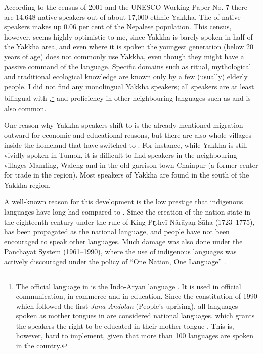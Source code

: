 According to the  census of 2001 \citep{CBS2001Report} and the UNESCO Working Paper No. 7 \citep{Toba2005Unesco}  there are 14,648 native speakers out of about 17,000 ethnic Yakkha. The  of native speakers makes up 0.06 per cent of the Nepalese population. This census, however, seems highly optimistic to me, since Yakkha is barely spoken in half of the Yakkha area, and even where it is spoken the youngest generation (below 20 years of age) does not commonly use Yakkha, even though they might have a passive command of the language. Specific domains such as ritual, mythological and traditional ecological knowledge are known only by a few (usually) elderly people. I did not find any monolingual Yakkha speakers; all speakers are at least bilingual with ,\footnote{The official language in  is the Indo-Aryan language . It is used in official communication,  in commerce and in  education. Since the constitution of 1990 which followed the first \emph{Jana Andolan} (People's uprising), all languages spoken as mother tongues in  are considered national languages, which grants the speakers the right to be educated in their mother tongue \citep{Turin2007_Diversity}. This is, however, hard to implement, given that more than 100 languages are spoken in the country.} and proficiency in other neighbouring languages such as  and  is also common.

One reason why Yakkha  speakers shift to  is the already mentioned migration outward for economic and educational reasons, but there are also whole  villages inside the  homeland that have switched to . For instance, while Yakkha is still vividly spoken in Tumok, it is difficult to find speakers in the neighbouring villages Mamling, Waleng and in the old garrison town Chainpur (a former center for trade in the region). Most speakers of Yakkha are found in the south of the Yakkha region.

A well-known reason for this development is the low prestige that indigenous languages have long  had compared to . Since the creation of the  nation state in the eighteenth century under the rule of King Pr̥thvī Nārāyaṇ Śāha (1723–1775),  has been propagated as the national language, and people have  not been encouraged to speak other languages. Much damage was also done under the Panchayat System (1961–1990), where the use of indigenous languages was actively discouraged under the policy of “One Nation, One Language” \citep[20]{Toba2005Unesco}.

